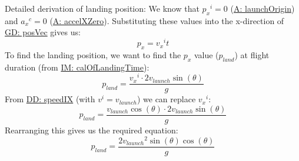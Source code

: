 \documentclass[12pt]{article}
\begin{document}
Detailed derivation of landing position:
We know that ${{p_{x}}^{i}}=0$ (\hyperref[launchOrigin]{A: launchOrigin}) and ${{a_{x}}^{c}}=0$ (\hyperref[accelXZero]{A: accelXZero}). Substituting these values into the x-direction of \hyperref[GD:posVec]{GD: posVec} gives us:
\begin{displaymath}
{p_{x}}={{v_{x}}^{i}} t
\end{displaymath}
To find the landing position, we want to find the ${p_{x}}$ value (${p_{land}}$) at flight duration (from \hyperref[IM:calOfLandingTime]{IM: calOfLandingTime}):
\begin{displaymath}
{p_{land}}=\frac{{{v_{x}}^{i}}\cdot{}2 {v_{launch}} \sin\left(θ\right)}{g}
\end{displaymath}
From \hyperref[DD:speedIX]{DD: speedIX} (with ${v^{i}}={v_{launch}}$) we can replace ${{v_{x}}^{i}}$:
\begin{displaymath}
{p_{land}}=\frac{{v_{launch}} \cos\left(θ\right)\cdot{}2 {v_{launch}} \sin\left(θ\right)}{g}
\end{displaymath}
Rearranging this gives us the required equation:
\begin{displaymath}
{p_{land}}=\frac{2 {v_{launch}}^{2} \sin\left(θ\right) \cos\left(θ\right)}{g}
\end{displaymath}
\par~
\end{document}

